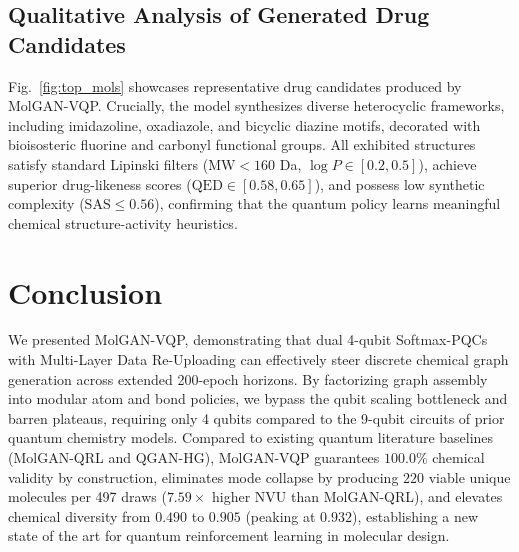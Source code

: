 \documentclass[conference]{IEEEtran}
\begin{document}
\subsection{Qualitative Analysis of Generated Drug Candidates}
Fig.~\ref{fig:top_mols} showcases representative drug candidates produced by MolGAN-VQP. Crucially, the model synthesizes diverse heterocyclic frameworks, including imidazoline, oxadiazole, and bicyclic diazine motifs, decorated with bioisosteric fluorine and carbonyl functional groups. All exhibited structures satisfy standard Lipinski filters ($\text{MW} < 160$ Da, $\log P \in [0.2, 0.5]$), achieve superior drug-likeness scores ($\text{QED} \in [0.58, 0.65]$), and possess low synthetic complexity ($\text{SAS} \le 0.56$), confirming that the quantum policy learns meaningful chemical structure-activity heuristics.

\section{Conclusion}
We presented MolGAN-VQP, demonstrating that dual 4-qubit Softmax-PQCs with Multi-Layer Data Re-Uploading can effectively steer discrete chemical graph generation across extended 200-epoch horizons. By factorizing graph assembly into modular atom and bond policies, we bypass the qubit scaling bottleneck and barren plateaus, requiring only 4 qubits compared to the 9-qubit circuits of prior quantum chemistry models. Compared to existing quantum literature baselines (MolGAN-QRL and QGAN-HG), MolGAN-VQP guarantees $100.0\%$ chemical validity by construction, eliminates mode collapse by producing $220$ viable unique molecules per 497 draws ($7.59\times$ higher NVU than MolGAN-QRL), and elevates chemical diversity from $0.490$ to $0.905$ (peaking at $0.932$), establishing a new state of the art for quantum reinforcement learning in molecular design.
\end{document}
